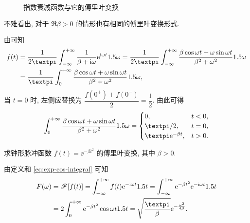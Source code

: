 \begin{figure}[H]
  \centering
  \caption{指数衰减函数与它的傅里叶变换}
\end{figure}

不难看出, 对于 $\Re\beta>0$ 的情形也有相同的傅里叶变换形式.

由\thmFI 可知
\begin{align*}
    f(t)
  &=\frac1{2\cpi}\intff \frac1{\beta+\ii \omega}\ee^{\ii \omega t}\d \omega
   =\frac1{2\cpi}\intff \frac{\beta\cos\omega t+\omega\sin\omega t}{\beta^2+\omega^2}\d \omega\\
  &=\frac1{\cpi}\intf \frac{\beta\cos\omega t+\omega\sin\omega t}{\beta^2+\omega^2}\d \omega,
\end{align*}
当 $t=0$ 时, 左侧应替换为 $\dfrac{f(0^+)+f(0^-)}2=\dfrac12$.
由此可得
\[
  \intf\frac{\beta\cos\omega t+\omega\sin\omega t}{\beta^2+\omega^2}\d\omega
  =\begin{cases}
    0,&t<0,\\
    \cpi/2,&t=0,\\
    \cpi \ee^{-\beta t},&t>0.
  \end{cases}
\]

\begin{example}
  求钟形脉冲函数 $f(t)=\ee^{-\beta t^2}$ 的傅里叶变换, 其中 $\beta>0$.
\end{example}

\begin{solution}
  由定义和 \ref{eq:exp-cos-integral} 可知
  \begin{align*}
    F(\omega)&=\msf[f(t)]=\intff f(t)\ee^{-\ii \omega t}\d t
    =\intff \ee^{-\beta t^2}\ee^{-\ii \omega t}\d t\\
    &=2\intf \ee^{-\beta t^2}\cos \omega t\d t
    =\sqrt{\frac\cpi\beta}\ee^{-\frac{\omega^2}{4\beta}}.
  \end{align*}
\end{solution}


